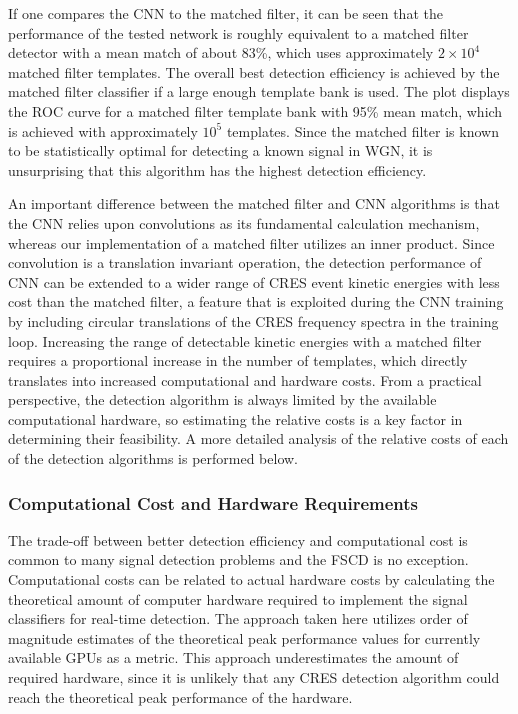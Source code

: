 If one compares the CNN to the matched filter, it can be seen that the performance of the tested network is roughly equivalent to a matched filter detector with a mean match of about 83\%, which uses approximately $2\times10^4$ matched filter templates. The overall best detection efficiency is achieved by the matched filter classifier if a large enough template bank is used. The plot displays the ROC curve for a matched filter template bank with 95\% mean match, which is achieved with approximately $10^5$ templates. Since the matched filter is known to be statistically optimal for detecting a known signal in WGN, it is unsurprising that this algorithm has the highest detection efficiency.

An important difference between the matched filter and CNN algorithms is that the CNN relies upon convolutions as its fundamental calculation mechanism, whereas our implementation of a matched filter utilizes an inner product. Since convolution is a translation invariant operation, the detection performance of CNN can be extended to a wider range of CRES event kinetic energies with less cost than the matched filter, a feature that is exploited during the CNN training by including circular translations of the CRES frequency spectra in the training loop. Increasing the range of detectable kinetic energies with a matched filter requires a proportional increase in the number of templates, which directly translates into increased computational and hardware costs. From a practical perspective, the detection algorithm is always limited by the available computational hardware, so estimating the relative costs is a key factor in determining their feasibility. A more detailed analysis of the relative costs of each of the detection algorithms is performed below.


\subsubsection{Computational Cost and Hardware Requirements}
\label{sec:dis-comp-cost}

The trade-off between better detection efficiency and computational cost is common to many signal detection problems and the FSCD is no exception. Computational costs can be related to actual hardware costs by calculating the theoretical amount of computer hardware required to implement the signal classifiers for real-time detection. The approach taken here utilizes order of magnitude estimates of the theoretical peak performance values for currently available GPUs as a metric. This approach underestimates the amount of required hardware, since it is unlikely that any CRES detection algorithm could reach the theoretical peak performance of the hardware. 


